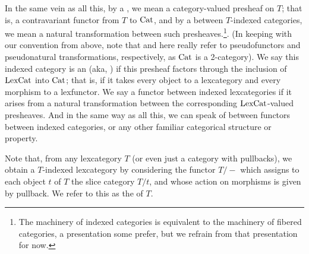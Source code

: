 \begin{definition}
In the same vein as all this, by a , we mean a category-valued presheaf on $T$; that is, a contravariant functor from $T$ to $\mathrm{Cat}$, and by a  between $T$-indexed categories, we mean a natural transformation between such presheaves.\footnote{The machinery of indexed categories is equivalent to the machinery of fibered categories, a presentation some prefer, but we refrain from that presentation for now.}. (In keeping with our convention from above, note that  and  here really refer to pseudofunctors and pseudonatural transformations, respectively, as $\mathrm{Cat}$ is a 2-category). We say this indexed category is an  (aka, ) if this presheaf factors through the inclusion of $\mathrm{LexCat}$ into $\mathrm{Cat}$; that is, if it takes every object to a lexcategory and every morphism to a lexfunctor. We say a functor between indexed lexcategories  if it arises from a natural transformation between the corresponding $\mathrm{LexCat}$-valued presheaves. And in the same way as all this, we can speak of  between functors between indexed categories, or any other familiar categorical structure or property.
\end{definition}

\begin{definition}
Note that, from any lexcategory $T$ (or even just a category with pullbacks), we obtain a $T$-indexed lexcategory by considering the functor $T/-$ which assigns to each object $t$ of $T$ the slice category $T/t$, and whose action on morphisms is given by pullback. We refer to this as the  of $T$.
\end{definition}


